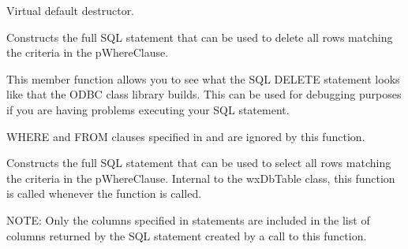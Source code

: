 \label{wxdbtabledestr}


Virtual default destructor.


\label{wxdbtablebuilddeletestmt}


Constructs the full SQL statement that can be used to delete all rows matching
the criteria in the pWhereClause.




This member function allows you to see what the SQL DELETE statement looks like
that the ODBC class library builds.  This can be used for debugging purposes if
you are having problems executing your SQL statement.

WHERE and FROM clauses specified in  
and  are ignored by 
this function.


\label{wxdbtablebuildselectstmt}


Constructs the full SQL statement that can be used to select all rows matching
the criteria in the pWhereClause.  Internal to the wxDbTable class, this 
function is called whenever the function 
is called.

NOTE: Only the columns specified in 
statements are included in the list of columns returned by the SQL statement 
created by a call to this function.

